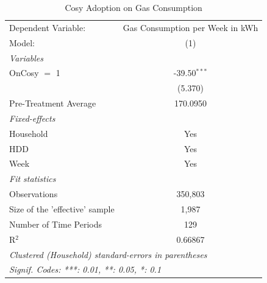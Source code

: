 
\begin{table}[htbp]
   \caption{\label{tab:gascosy} Cosy Adoption on Gas Consumption}
   \centering
   \begin{tabular}{lc}
      \tabularnewline \midrule \midrule
      Dependent Variable:            & Gas Consumption per Week in kWh\\  
      Model:                         & (1)\\  
      \midrule
      \emph{Variables}\\
      OnCosy $=$ 1                   & -39.50$^{***}$\\   
                                     & (5.370)\\   
      \midrule
      Pre-Treatment Average          & 170.0950\\  
\midrule
      \emph{Fixed-effects}\\
      Household                      & Yes\\  
      HDD                            & Yes\\  
      Week                           & Yes\\  
      \midrule
      \emph{Fit statistics}\\
      Observations                   & 350,803\\  
      Size of the 'effective' sample & 1,987\\  
      Number of Time Periods         & 129\\  
      R$^2$                          & 0.66867\\  
      \midrule \midrule
      \multicolumn{2}{l}{\emph{Clustered (Household) standard-errors in parentheses}}\\
      \multicolumn{2}{l}{\emph{Signif. Codes: ***: 0.01, **: 0.05, *: 0.1}}\\
   \end{tabular}
\end{table}


